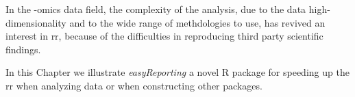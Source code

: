 In the -omics data field, the complexity of the analysis, due to the data high-dimensionality and to the wide range of methdologies to use, has revived an interest in \gls{rr}, because of the difficulties in reproducing third party scientific findings.

In this Chapter we illustrate \textit{easyReporting} a novel R package for speeding up the \gls{rr} when analyzing data or when constructing other packages.
